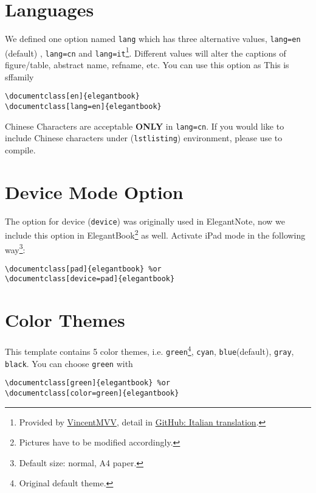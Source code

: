 \documentclass[11pt,fancy,twocol,twoside]{elegantbook}
\begin{document}
\section{Languages}
We defined one option named \lstinline{lang} which has three alternative values, \lstinline{lang=en} (default) , \lstinline{lang=cn} and \lstinline{lang=it}\footnote{Provided by \href{https://github.com/VincentMVV}{VincentMVV}, detail in \href{https://github.com/ElegantLaTeX/ElegantBook/issues/85}{GitHub: Italian translation}.}. Different values will alter the captions of figure/table, abstract name, refname, etc. You can use this option as {\sffamily This is sffamily}
\begin{lstlisting}
\documentclass[en]{elegantbook} 
\documentclass[lang=en]{elegantbook}
\end{lstlisting}

\begin{remark}
Chinese Characters  are acceptable \textbf{ONLY} in \lstinline{lang=cn}. If you would like to include Chinese characters under (\lstinline{lstlisting}) environment, please use  to compile.
\end{remark}

\section{Device Mode Option}
The option for device (\lstinline{device}) was originally used in ElegantNote, now we include this option in ElegantBook\footnote{Pictures have to be modified accordingly.} as well. Activate iPad mode in the following way\footnote{Default size: normal, A4 paper.}:
\begin{lstlisting}
\documentclass[pad]{elegantbook} %or
\documentclass[device=pad]{elegantbook}
\end{lstlisting}

\section{Color Themes}
This template contains 5 color themes, i.e. \textcolor{structure1}{\lstinline{green}}\footnote{Original default theme.}, \textcolor{structure2}{\lstinline{cyan}}, \textcolor{structure3}{\lstinline{blue}}(default), \textcolor{structure4}{\lstinline{gray}}, \textcolor{structure5}{\lstinline{black}}. You can choose \lstinline{green} with
\begin{lstlisting}
\documentclass[green]{elegantbook} %or
\documentclass[color=green]{elegantbook}
\end{lstlisting}
\end{document}
